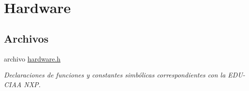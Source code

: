 \hypertarget{group__hardware}{}\section{Hardware}
\label{group__hardware}
\subsection*{Archivos}
\begin{DoxyCompactItemize}
\item 
archivo \hyperlink{hardware_8h}{hardware.\+h}
\begin{DoxyCompactList}\small\item\em Declaraciones de funciones y constantes simbólicas correspondientes con la E\+D\+U-\/\+C\+I\+AA N\+XP. \end{DoxyCompactList}\end{DoxyCompactItemize}
